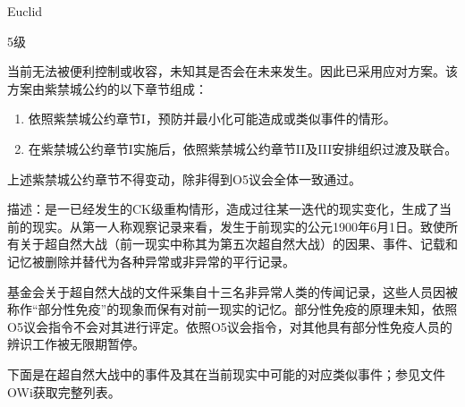 
Euclid

5级

当前无法被便利控制或收容，未知其是否会在未来发生。因此已采用应对方案。该方案由紫禁城公约的以下章节组成：

\begin{enumerate}

	\item 依照紫禁城公约章节I，预防并最小化可能造成或类似事件的情形。
	\item 在紫禁城公约章节I实施后，依照紫禁城公约章节II及III安排组织过渡及联合。

\end{enumerate}

上述紫禁城公约章节不得变动，除非得到O5议会全体一致通过。

描述：是一已经发生的CK级重构情形，造成过往某一迭代的现实变化，生成了当前的现实。从第一人称观察记录来看，发生于前现实的公元1900年6月1日。致使所有关于超自然大战（前一现实中称其为第五次超自然大战）的因果、事件、记载和记忆被删除并替代为各种异常或非异常的平行记录。

基金会关于超自然大战的文件采集自十三名非异常人类的传闻记录，这些人员因被称作“部分性免疫”的现象而保有对前一现实的记忆。部分性免疫的原理未知，依照O5议会指令不会对其进行评定。依照O5议会指令，对其他具有部分性免疫人员的辨识工作被无限期暂停。

下面是在超自然大战中的事件及其在当前现实中可能的对应类似事件；参见文件OWi获取完整列表。


